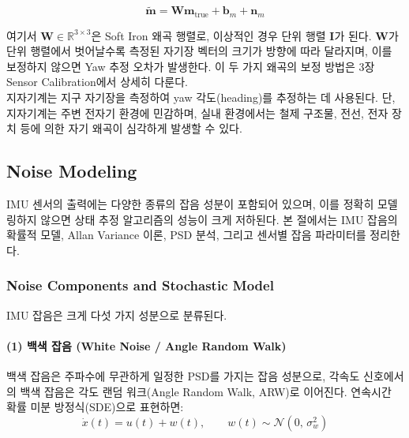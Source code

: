                \begin{equation}
                    \tilde{\mathbf{m}} = \mathbf{W} \mathbf{m}_{\text{true}} + \mathbf{b}_m + \mathbf{n}_m
                    \label{eq:mag_model_full}
                \end{equation}

                \noindent 여기서 $\mathbf{W} \in \mathbb{R}^{3\times 3}$은 Soft Iron 왜곡 행렬로, 이상적인 경우 단위 행렬 $\mathbf{I}$가 된다. $\mathbf{W}$가 단위 행렬에서 벗어날수록 측정된 자기장 벡터의 크기가 방향에 따라 달라지며, 이를 보정하지 않으면 Yaw 추정 오차가 발생한다. 이 두 가지 왜곡의 보정 방법은 3장 Sensor Calibration에서 상세히 다룬다.\\

                지자기계는 지구 자기장을 측정하여 yaw 각도(heading)를 추정하는 데 사용된다. 단, 지자기계는 주변 전자기 환경에 민감하며, 실내 환경에서는 철제 구조물, 전선, 전자 장치 등에 의한 자기 왜곡이 심각하게 발생할 수 있다.\\

    \subsection{Noise Modeling}
        IMU 센서의 출력에는 다양한 종류의 잡음 성분이 포함되어 있으며, 이를 정확히 모델링하지 않으면 상태 추정 알고리즘의 성능이 크게 저하된다. 본 절에서는 IMU 잡음의 확률적 모델, Allan Variance 이론, PSD 분석, 그리고 센서별 잡음 파라미터를 정리한다.\\

        \subsubsection{Noise Components and Stochastic Model}
            IMU 잡음은 크게 다섯 가지 성분으로 분류된다.\\

            \paragraph{(1) 백색 잡음 (White Noise / Angle Random Walk)}
                백색 잡음은 주파수에 무관하게 일정한 PSD를 가지는 잡음 성분으로, 각속도 신호에서의 백색 잡음은 각도 랜덤 워크(Angle Random Walk, ARW)로 이어진다. 연속시간 확률 미분 방정식(SDE)으로 표현하면:\\

                \begin{equation}
                    \dot{x}(t) = u(t) + w(t), \qquad w(t) \sim \mathcal{N}(0,\, \sigma_w^2)
                    \label{eq:white_noise_sde}
                \end{equation}

